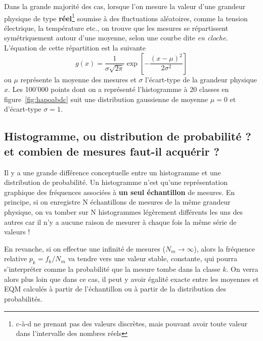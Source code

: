 Dans la grande majorité des cas, lorsque l'on mesure la valeur d'une grandeur physique de type \textbf{réel}\footnote{c-à-d ne prenant pas des valeurs discrètes, mais pouvant avoir toute valeur dans l'intervalle des nombres réels} soumise à des fluctuations aléatoires, comme la tension électrique, la température etc., on trouve que les mesures se répartissent symétriquement autour d'une moyenne, selon une courbe dite \textit{en cloche}. L'équation de cette répartition est la suivante
\begin{equation}
g(x)=\frac{1}{\sigma\sqrt{2\pi}}\exp{\left[-\frac{(x-\mu)^2}{2\sigma^2}\right]}
\end{equation}
ou $\mu$ représente la moyenne des mesures et $\sigma$ l'écart-type de la grandeur physique $x$. Les 100'000 points dont on a représenté l'histogramme à 20 classes en figure~\ref{fig:hapoabdc} suit une distribution gaussienne de moyenne $\mu=0$ et d'écart-type $\sigma=1$.

\subsection*{Histogramme, ou distribution de probabilité ? et combien de mesures faut-il acquérir ?}

Il y a une grande différence conceptuelle entre un histogramme et une distribution de probabilité. Un histogramme n'est qu'une représentation graphique des fréquences associées à \textbf{un seul échantillon} de mesures. En principe, si on enregistre N échantillons de mesures de la même grandeur physique, on va tomber sur N histogrammes légèrement différents les uns des autres car il n'y a aucune raison de mesurer à chaque fois la même série de valeurs !

En revanche, si on effectue une infinité de mesures ($N_m\rightarrow\infty$), alors la fréquence relative $p_k=f_k/N_m$ va tendre vers une valeur stable, constante, qui pourra s'interpréter comme la probabilité que la mesure tombe dans la classe $k$. On verra alors plus loin que dans ce cas, il peut y avoir égalité exacte entre les moyennes et EQM calculés à partir de l'échantillon ou à partir de la distribution des probabilités.

